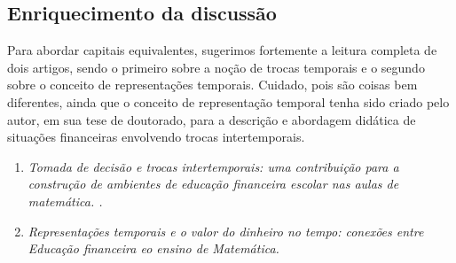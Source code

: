 \begin{paginatexto}
\section{Enriquecimento da discussão}

Para abordar capitais equivalentes, sugerimos fortemente a leitura completa de dois artigos, sendo o primeiro sobre a noção de trocas temporais e o segundo sobre o conceito de representações temporais. Cuidado, pois são coisas bem diferentes, ainda que o conceito de representação temporal tenha sido criado pelo autor, em sua tese de doutorado, para a descrição e abordagem didática de situações financeiras envolvendo trocas intertemporais.

\begin{enumerate}
  \item \textit{Tomada de decisão e trocas intertemporais: uma contribuição para a construção de ambientes de educação financeira escolar nas aulas de matemática. \citep{muniz2016c}.}

  \item \textit{Representações temporais e o valor do dinheiro no tempo: conexões entre Educação financeira eo ensino de Matemática.}
\end{enumerate}


\end{paginatexto}
